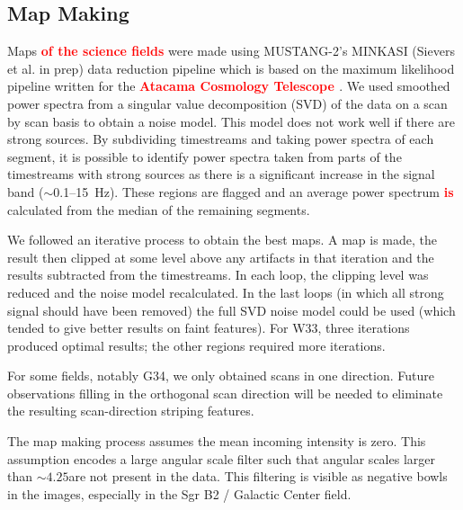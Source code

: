 \documentclass[twocolumn]{aastex62}
\def\edit#1{{\textcolor{red}{\textbf{#1}}}}
\def\change#1{{\textcolor{red}{\textbf{#1}}}}
\newcommand{\MUSTANG}{MUSTANG-2\xspace}
\begin{document}
\subsection{Map Making}
Maps \edit{of the science fields} were made using \MUSTANG's MINKASI (Sievers
et al. in prep) data reduction pipeline which is based on the maximum
likelihood pipeline written for the \change{Atacama Cosmology Telescope
\citep[ACT;][]{Dunner2013a}}.
We used smoothed power spectra from a singular value decomposition (SVD) of the
data on a scan by scan basis to obtain a noise model.
This model does not work well if there are strong sources.
By subdividing timestreams and taking power spectra of each segment, it is
possible to identify power spectra taken from parts of the timestreams with
strong sources as there is a significant increase in the signal band
($\sim$0.1--15~Hz). These regions are flagged and an average power spectrum
\edit{is} calculated from the median of the remaining segments.

We followed an iterative process to obtain the best maps.  A map is made, the
result then clipped at some level above any artifacts in that iteration and the
results subtracted from the timestreams.  In each loop, the clipping level was
reduced and the noise model recalculated.  In the last loops (in which all
strong signal should have been removed) the full SVD noise model could be used
(which tended to give better results on faint features). For W33, three
iterations produced optimal results; the other regions required more
iterations.

For some fields, notably G34, we only obtained scans in one direction.  Future
observations filling in the orthogonal scan direction will be needed to eliminate
the resulting scan-direction striping features.

The map making process assumes the mean incoming intensity is zero.  This
assumption encodes a large angular scale filter such that angular scales larger
than $\sim4.25$\arcmin are not present in the data.  This filtering is visible
as negative bowls in the images, especially in the Sgr B2 / Galactic Center
field.
\end{document}
